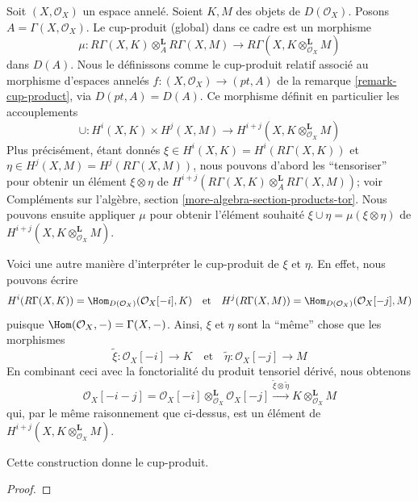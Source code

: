 {Soit $(X, \mathcal{O}_X)$ un espace annelé. Soient $K, M$ des objets de $D(\mathcal{O}_X)$. Posons $A = \Gamma(X, \mathcal{O}_X)$. Le cup-produit (global) dans ce cadre est un morphisme
$$
\mu :
R\Gamma(X, K) \otimes_A^\mathbf{L} R\Gamma(X, M)
\longrightarrow
R\Gamma(X, K \otimes_{\mathcal{O}_X}^\mathbf{L} M)
$$
dans $D(A)$. Nous le définissons comme le cup-produit relatif associé au morphisme d'espaces annelés $f : (X, \mathcal{O}_X) \to (pt, A)$
de la remarque \ref{remark-cup-product}, via $D(pt, A) = D(A)$. Ce morphisme définit en particulier les accouplements
$$
\cup :
H^i(X, K) \times H^j(X, M)
\longrightarrow
H^{i + j}(X, K \otimes_{\mathcal{O}_X}^\mathbf{L} M)
$$
Plus précisément, étant donnés $\xi \in H^i(X, K) = H^i(R\Gamma(X, K))$ et
$\eta \in H^j(X, M) = H^j(R\Gamma(X, M))$, nous pouvons d'abord les ``tensoriser'' pour obtenir un élément $\xi \otimes \eta$ de
$H^{i + j}(R\Gamma(X, K) \otimes_A^\mathbf{L} R\Gamma(X, M))$; voir Compléments sur l'algèbre, section \ref{more-algebra-section-products-tor}. Nous pouvons ensuite appliquer $\mu$ pour obtenir l'élément souhaité
$\xi \cup \eta = \mu(\xi \otimes \eta)$
de $H^{i + j}(X, K \otimes_{\mathcal{O}_X}^\mathbf{L} M)$.

\medskip\noindent
Voici une autre manière d'interpréter le cup-produit de $\xi$ et $\eta$. En effet, nous pouvons écrire $$
H^i(R\Gamma(X, K)) = \Hom_{D(\mathcal{O}_X)}(\mathcal{O}_X[-i], K)
\quad\text{et}\quad
H^j(R\Gamma(X, M)) = \Hom_{D(\mathcal{O}_X)}(\mathcal{O}_X[-j], M)
$$ puisque $\Hom(\mathcal{O}_X, -) = \Gamma(X, -)$. Ainsi, $\xi$ et $\eta$ sont la ``même'' chose que les morphismes $$
\tilde \xi : \mathcal{O}_X[-i] \to K
\quad\text{et}\quad
\tilde \eta : \mathcal{O}_X[-j] \to M
$$ En combinant ceci avec la fonctorialité du produit tensoriel dérivé, nous obtenons $$
\mathcal{O}_X[-i - j] =
\mathcal{O}_X[-i] \otimes_{\mathcal{O}_X}^\mathbf{L} \mathcal{O}_X[-j]
\xrightarrow{\tilde \xi \otimes \tilde \eta}
K \otimes_{\mathcal{O}_X}^\mathbf{L} M
$$ qui, par le même raisonnement que ci-dessus, est un élément de $H^{i + j}(X, K \otimes_{\mathcal{O}_X}^\mathbf{L} M)$.

\begin{lemma}

\label{lemma-second-cup-equals-first}

Cette construction donne le cup-produit.

\end{lemma}

\begin{proof}


\end{proof}}
